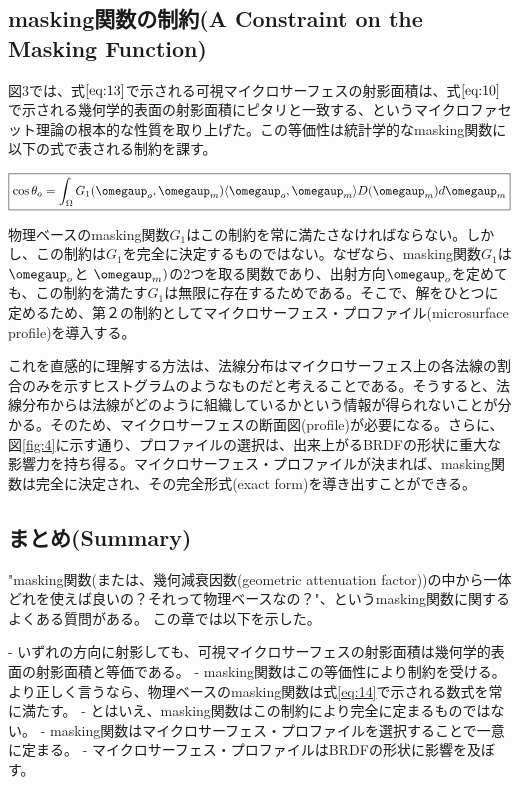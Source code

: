 \documentclass[a4j,xelatex,ja=standard]{bxjsarticle}
\begin{document}
\subsection{masking関数の制約(A Constraint on the Masking Function)}

図3では、式$\eqref{eq:13}$で示される可視マイクロサーフェスの射影面積は、式$\eqref{eq:10}$で示される幾何学的表面の射影面積にピタリと一致する、というマイクロファセット理論の根本的な性質を取り上げた。この等価性は統計学的なmasking関数に以下の式で表される制約を課す。

\begin{equation}
    \boxed{
    \cos \theta_o = \int_\Omega G_1(\boldsymbol{\omegaup}_o, \boldsymbol{\omegaup}_m) \langle \boldsymbol{\omegaup}_o, \boldsymbol{\omegaup}_m \rangle D(\boldsymbol{\omegaup}_m) d\boldsymbol{\omegaup}_m
    }
    \label{eq:14}
\end{equation}

物理ベースのmasking関数$G_1$はこの制約を常に満たさなければならない。しかし、この制約は$G_1$を完全に決定するものではない。なぜなら、masking関数$G_1$は$\boldsymbol{\omegaup}_o$と $\boldsymbol{\omegaup}_m)$の2つを取る関数であり、出射方向$\boldsymbol{\omegaup}_o$を定めても、この制約を満たす$G_1$は無限に存在するためである。そこで、解をひとつに定めるため、第２の制約としてマイクロサーフェス・プロファイル(microsurface profile)を導入する。

これを直感的に理解する方法は、法線分布はマイクロサーフェス上の各法線の割合のみを示すヒストグラムのようなものだと考えることである。そうすると、法線分布からは法線がどのように組織しているかという情報が得られないことが分かる。そのため、マイクロサーフェスの断面図(profile)が必要になる。さらに、図\ref{fig:4}に示す通り、プロファイルの選択は、出来上がるBRDFの形状に重大な影響力を持ち得る。マイクロサーフェス・プロファイルが決まれば、masking関数は完全に決定され、その完全形式(exact form)を導き出すことができる。

\subsection{まとめ(Summary)}

"masking関数(または、幾何減衰因数(geometric attenuation factor))の中から一体どれを使えば良いの？それって物理ベースなの？"、というmasking関数に関するよくある質問がある。
この章では以下を示した。

- いずれの方向に射影しても、可視マイクロサーフェスの射影面積は幾何学的表面の射影面積と等価である。
- masking関数はこの等価性により制約を受ける。より正しく言うなら、物理ベースのmasking関数は式\eqref{eq:14}で示される数式を常に満たす。
- とはいえ、masking関数はこの制約により完全に定まるものではない。
- masking関数はマイクロサーフェス・プロファイルを選択することで一意に定まる。
- マイクロサーフェス・プロファイルはBRDFの形状に影響を及ぼす。
\end{document}
